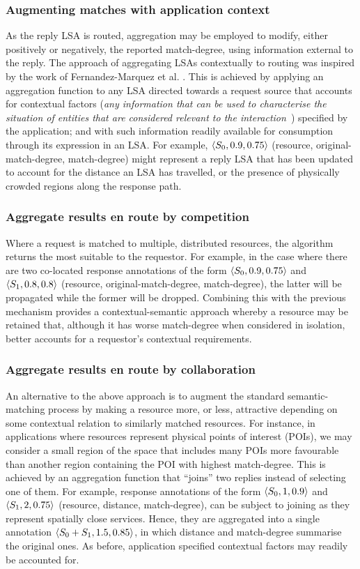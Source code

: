 \documentclass[12pt,a4paper,twoside,openright]{book}
\begin{document}
\subsubsection{Augmenting matches with application context}
As the reply LSA is routed, aggregation may be employed to modify, either positively or negatively, the reported match-degree, using information external to the reply.
%
The approach of aggregating LSAs contextually to routing was inspired by the work of Fernandez-Marquez et al. \cite{fernandez-marquez2012analysis}.
%
This is achieved by applying an aggregation function to any LSA directed towards a request source that accounts for contextual factors (\emph{any information that can be used to characterise the situation of entities that are considered relevant to the interaction}~\cite{dey2001conceptual}) specified by the application; and with such information readily available for consumption through its expression in an LSA.
%
For example, $\langle S_0, 0.9, 0.75\rangle$ (resource, original-match-degree, match-degree) might represent a reply LSA that has been updated to account for the distance an LSA has travelled, or the presence of physically crowded regions along the response path. 

\subsubsection{Aggregate results en route by competition}
Where a request is matched to multiple, distributed resources, the algorithm returns the most suitable to the requestor.
%
For example, in the case where there are two co-located response annotations of the form $\langle S_0, 0.9, 0.75\rangle$ and $\langle S_1, 0.8, 0.8\rangle$ (resource, original-match-degree, match-degree), the latter will be propagated while the former will be dropped.
%
Combining this with the previous mechanism provides a contextual-semantic approach whereby a resource may be retained that, although it has worse match-degree when considered in isolation, better accounts for a requestor's contextual requirements.

\subsubsection{Aggregate results en route by collaboration}
An alternative to the above approach is to augment the standard semantic-matching process by making a resource more, or less, attractive depending on some contextual relation to similarly matched resources.
%
For instance, in applications where resources represent physical points of interest (POIs), we may consider a small region of the space that includes many POIs more favourable than another region containing the POI with highest match-degree. 
%
This is achieved by an aggregation function that ``joins'' two replies instead of selecting one of them. For example, response annotations of the form $\langle S_0, 1 , 0.9\rangle$ and $\langle S_1, 2, 0.75\rangle$ (resource, distance, match-degree), can be subject to joining as they represent spatially close services.
%
Hence, they are aggregated into a single annotation $\langle S_0+S_1, 1.5 , 0.85\rangle$, in which distance and match-degree summarise the original ones.
%
As before, application specified contextual factors may readily be accounted for.
\end{document}
